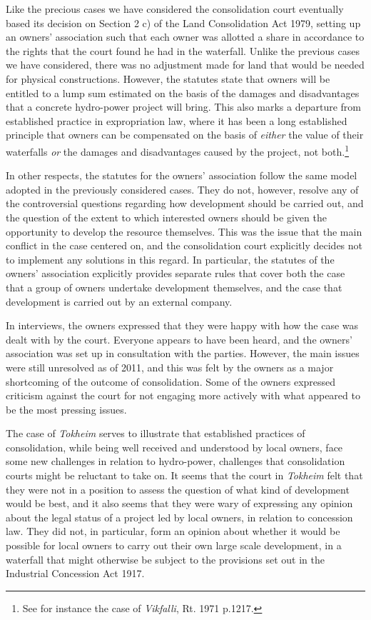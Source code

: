Like the precious cases we have considered the consolidation court eventually based its decision on Section 2 c) of the Land Consolidation Act 1979, setting up an owners' association such that each owner was allotted a share in accordance to the rights that the court found he had in the waterfall. Unlike the previous cases we have considered, there was no adjustment made for land that would be needed for physical constructions. However, the statutes state that owners will be entitled to a lump sum estimated on the basis of the damages and disadvantages that a concrete hydro-power project will bring. This also marks a departure from established practice in expropriation law, where it has been a long established principle that owners can be compensated on the basis of \emph{either} the value of their waterfalls \emph{or} the damages and disadvantages caused by the project, not both.\footnote{See for instance the case of \emph{Vikfalli}, Rt. 1971 p.1217.} 

In other respects, the statutes for the owners' association follow the same model adopted in the previously considered cases. They do not, however, resolve any of the controversial questions regarding how development should be carried out, and the question of the extent to which interested owners should be given the opportunity to develop the resource themselves. This was the issue that the main conflict in the case centered on, and the consolidation court explicitly decides not to implement any solutions in this regard. In particular, the statutes of the owners' association explicitly provides separate rules that cover both the case that a group of owners undertake development themselves, and the case that development is carried out by an external company. 

In interviews, the owners expressed that they were happy with how the case was dealt with by the court. Everyone appears to have been heard, and the owners' association was set up in consultation with the parties. However, the main issues were still unresolved as of 2011, and this was felt by the owners as a major shortcoming of the outcome of consolidation. Some of the owners expressed criticism against the court for not engaging more actively with what appeared to be the most pressing issues.

The case of \emph{Tokheim} serves to illustrate that established practices of consolidation, while being well received and understood by local owners, face some new challenges in relation to hydro-power, challenges that consolidation courts might be reluctant to take on. It seems that the court in \emph{Tokheim} felt that they were not in a position to assess the question of what kind of development would be best, and it also seems that they were wary of expressing any opinion about the legal status of a project led by local owners, in relation to concession law. They did not, in particular, form an opinion about whether it would be possible for local owners to carry out their own large scale development, in a waterfall that might otherwise be subject to the provisions set out in the Industrial Concession Act 1917.

